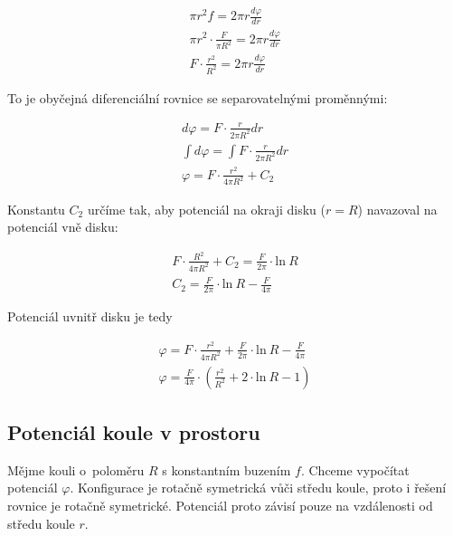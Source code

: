 \documentclass{book}
\begin{document}
\begin{equation}
\begin{split}
\pi r^2 f = 2 \pi r \frac{d \varphi}{dr} \\
\pi r^2 \cdot \frac{F}{\pi R^2} = 2 \pi r \frac{d \varphi}{dr} \\
F \cdot \frac{r^2}{R^2} = 2 \pi r \frac{d \varphi}{dr}
\end{split}
\end{equation}

To je obyčejná diferenciální rovnice se separovatelnými proměnnými:

\begin{equation}
\label{eq:potencial_disku_uvnitr}
\begin{split}
d \varphi = F \cdot \frac{r}{2 \pi R^2} dr \\
\int d \varphi = \int F \cdot \frac{r}{2 \pi R^2} dr \\
\varphi = F \cdot \frac{r^2}{4 \pi R^2} + C_2
\end{split}
\end{equation}

Konstantu \(C_2\) určíme tak, aby potenciál na okraji disku (\(r = R\)) navazoval na potenciál vně disku:

\begin{equation}
\begin{split}
F \cdot \frac{R^2}{4 \pi R^2} + C_2 = \frac{F}{2 \pi} \cdot \mathrm{ln} \ R \\
C_2 = \frac{F}{2 \pi} \cdot \mathrm{ln} \ R - \frac{F}{4 \pi}
\end{split}
\end{equation}

Potenciál uvnitř disku je tedy

\begin{equation}
\begin{split}
\varphi = F \cdot \frac{r^2}{4 \pi R^2} + \frac{F}{2 \pi} \cdot \mathrm{ln} \ R - \frac{F}{4 \pi} \\
\varphi = \frac{F}{4 \pi} \cdot \left (\frac{r^2}{R^2} + 2 \cdot \mathrm{ln} \ R - 1 \right)
\end{split}
\end{equation}


\subsection{Potenciál koule v prostoru}

Mějme kouli o~poloměru \(R\) s konstantním buzením \(f\). Chceme vypočítat potenciál \(\varphi\). Konfigurace je rotačně symetrická vůči středu
koule, proto i řešení rovnice je rotačně symetrické. Potenciál proto závisí pouze na vzdálenosti od středu koule \(r\).
\end{document}
